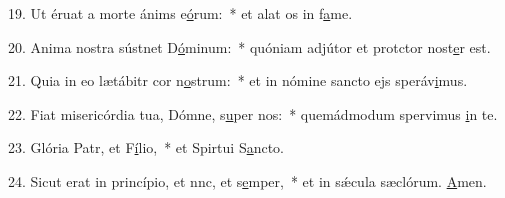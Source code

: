 19. Ut éruat a morte ánims e\uline{ó}rum:~* et alat os in f\uline{a}me.\par 
20. Anima nostra sústnet D\uline{ó}minum:~* quóniam adjútor et protctor nost\uline{e}r est.\par 
21. Quia in eo lætábitr cor n\uline{o}strum:~* et in nómine sancto ejs speráv\uline{i}mus.\par 
22. Fiat misericórdia tua, Dómne, s\uline{u}per nos:~* quemádmodum spervimus \uline{i}n te.\par 
23. Glória Patr, et F\uline{í}lio,~* et Spirtui S\uline{a}ncto.\par 
24. Sicut erat in princípio, et nnc, et s\uline{e}mper,~* et in sǽcula sæclórum. \uline{A}men.\par 

